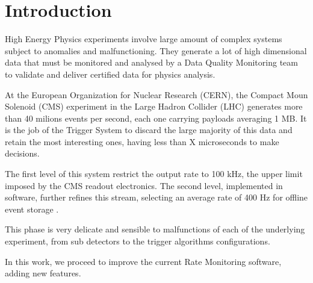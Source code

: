 \chapter{Introduction}

High Energy Physics experiments involve large amount of complex systems subject to anomalies and malfunctioning. They generate a lot of high dimensional data that must be monitored and analysed by a Data Quality Monitoring team to validate and deliver certified data for physics analysis.

At the European Organization for Nuclear Research (CERN), the Compact Moun Solenoid (CMS) experiment in the Large Hadron Collider (LHC) generates more than 40 milions events per second, each one carrying payloads averaging 1 MB. It is the job of the Trigger System to discard the large majority of this data and retain the most interesting ones, having less than X microseconds to make decisions. 

The first level of this system restrict the output rate to 100 kHz, the upper limit imposed by the CMS readout electronics. The second level, implemented in software, further refines this stream, selecting an average rate of 400 Hz for offline event storage \cite{Khachatryan_2017}.

This phase is very delicate and sensible to malfunctions of each of the underlying experiment, from sub detectors to the trigger algorithms configurations.

In this work, we proceed to improve the current Rate Monitoring software, adding new features.

